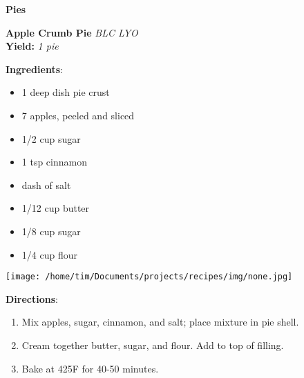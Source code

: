 \documentclass[11pt, twoside, openany]{book}
\begin{document}
{\newpage \LARGE \textbf{Pies}} \label{pies}\\
\noindent\begin{minipage}[t]{\linewidth}%
{\Large\textbf{Apple Crumb Pie}} \label{apple-crumb-pie}\hfill\textit{BLC LYO}\\
\textbf{Yield:} \textit{1 pie}\\
\noindent\begin{minipage}[t]{0.78\linewidth}%
\textbf{Ingredients}:\vspace{-3mm}
\begin{multicols}{2}
\begin{itemize}\setlength\itemsep{-1mm}
\item 1 deep dish pie crust
\item 7 apples, peeled and sliced
\item 1/2 cup sugar
\item 1 tsp cinnamon
\item dash of salt
\item 1/12 cup butter
\item 1/8 cup sugar
\item 1/4 cup flour
\end{itemize}
\end{multicols}
\end{minipage}
\noindent\begin{minipage}[t]{0.18\linewidth}
\centering \strut\vspace*{-\baselineskip}\newline
\texttt{[image: /home/tim/Documents/projects/recipes/img/none.jpg]}\\
\end{minipage}\vspace{3mm}
\textbf{Directions}:
\vspace{-3mm}\begin{enumerate}\setlength\itemsep{-1mm}
\item Mix apples, sugar, cinnamon, and salt; place mixture in pie shell.
\item Cream together butter, sugar, and flour. Add to top of filling.
\item Bake at 425F for 40-50 minutes.
\end{enumerate}
\end{minipage}\vspace{8mm}
\end{document}
